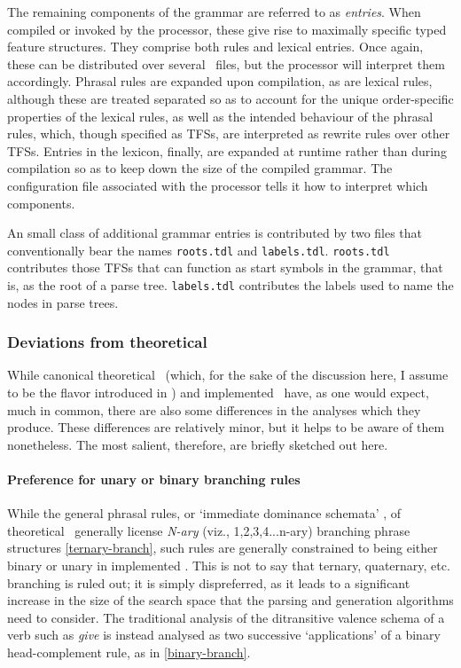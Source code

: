 The remaining components of the grammar are referred to as \emph{entries}. When
compiled or invoked by the processor, these give rise to maximally specific
typed feature structures. They comprise both rules and lexical entries. Once
again, these can be distributed over several \tdl\ files, but the processor
will interpret them accordingly. Phrasal rules are expanded upon compilation,
as are lexical rules, although these are treated separated so as to account for
the unique order-specific properties of the lexical rules, as well as the
intended behaviour of the phrasal rules, which, though specified as TFSs, are
interpreted as rewrite rules over other TFSs. Entries in the lexicon, finally,
are expanded at runtime rather than during compilation so as to keep down the
size of the compiled grammar. The configuration file associated with the
processor tells it how to interpret which components.

An small class of additional grammar entries is contributed by two files that
conventionally bear the names \texttt{roots.tdl} and \texttt{labels.tdl}.
\texttt{roots.tdl} contributes those TFSs that can function as start symbols in
the grammar, that is, as the root of a parse tree. \texttt{labels.tdl}
contributes the labels used to name the nodes in parse trees.

\subsubsection{Deviations from theoretical \hpsg}

While canonical theoretical \hpsg\ (which, for the sake of the discussion here,
I assume to be the flavor introduced in \citet{pollard1994head}) and
implemented \hpsg\ have, as one would expect, much in common, there are also
some differences in the analyses which they produce. These differences are relatively minor, but it helps to be aware of them nonetheless. The most salient, therefore, are briefly sketched out here.

\paragraph{Preference for unary or binary branching rules}
\label{par:naryvsbinary}

While the general phrasal rules, or `immediate dominance schemata'
\citep{pollard1994head}, of theoretical \hpsg\ generally license \emph{N-ary}
(viz., 1,2,3,4...n-ary) branching phrase structures \cref{ternary-branch}, such
rules are generally constrained to being either binary or unary in implemented
\hpsg. This is not to say that ternary, quaternary, etc. branching is ruled
out; it is simply dispreferred, as it leads to a significant increase in the
size of the search space that the parsing and generation algorithms need to
consider. The traditional analysis of the ditransitive valence schema of a verb
such as \emph{give} is instead analysed as two successive `applications' of
a binary head-complement rule, as in \cref{binary-branch}.


